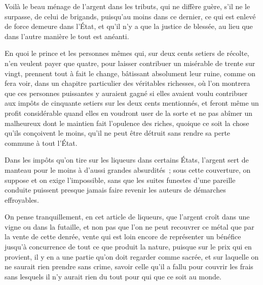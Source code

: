 \documentclass[french,twoside]{book} %
\begin{document}
Voilà le beau ménage de l’argent dans les tributs, qui ne diffère guère, s’il ne le surpasse, de celui de brigands, puisqu’au moins dans ce dernier, ce qui est enlevé de force demeure dans l’État, et qu’il n’y a que la justice de blessée, au lieu que dans l’autre manière le tout est anéanti.\par
En quoi le prince et les personnes mêmes qui, sur deux cents setiers de récolte, n’en veulent payer que quatre, pour laisser contribuer un misérable de trente sur vingt, prennent tout à fait le change, bâtissant absolument leur ruine, comme on fera voir, dans un chapitre particulier des véritables richesses, où l’on montrera que ces personnes puissantes y auraient gagné si elles avaient voulu contribuer aux impôts de cinquante setiers sur les deux cents mentionnés, et feront même un profit considérable quand elles en voudront user de la sorte et ne pas abîmer un malheureux dont le maintien fait l’opulence des riches, quoique ce soit la chose qu’ils conçoivent le moins, qu’il ne peut être détruit sans rendre sa perte commune à tout l’État.\par
Dans les impôts qu’on tire sur les liqueurs dans certains États, l’argent sert de manteau pour le moins à d’aussi grandes absurdités ; sous cette couverture, on suppose et on exige l’impossible, sans que les suites funestes d’une pareille conduite puissent presque jamais faire revenir les auteurs de démarches effroyables.\par
On pense tranquillement, en cet article de liqueurs, que l’argent croît dans une vigne ou dans la futaille, et non pas que l’on ne peut recouvrer ce métal que par la vente de cette denrée, vente qui est loin encore de représenter un bénéfice jusqu’à concurrence de tout ce que produit la nature, puisque sur le prix qui en provient, il y en a une partie qu’on doit regarder comme sacrée, et sur laquelle on ne saurait rien prendre sans crime, savoir celle qu’il a fallu pour couvrir les frais sans lesquels il n’y aurait rien du tout pour qui que ce soit au monde.\par
\end{document}
